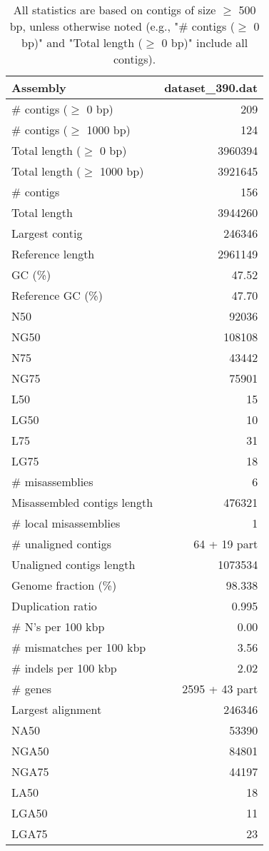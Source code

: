 \documentclass[12pt,a4paper]{article}
\begin{document}
\begin{table}[ht]
\begin{center}
\caption{All statistics are based on contigs of size $\geq$ 500 bp, unless otherwise noted (e.g., "\# contigs ($\geq$ 0 bp)" and "Total length ($\geq$ 0 bp)" include all contigs).}
\begin{tabular}{|l*{1}{|r}|}
\hline
Assembly & dataset\_390.dat \\ \hline
\# contigs ($\geq$ 0 bp) & 209 \\ \hline
\# contigs ($\geq$ 1000 bp) & 124 \\ \hline
Total length ($\geq$ 0 bp) & 3960394 \\ \hline
Total length ($\geq$ 1000 bp) & 3921645 \\ \hline
\# contigs & 156 \\ \hline
Total length & 3944260 \\ \hline
Largest contig & 246346 \\ \hline
Reference length & 2961149 \\ \hline
GC (\%) & 47.52 \\ \hline
Reference GC (\%) & 47.70 \\ \hline
N50 & 92036 \\ \hline
NG50 & 108108 \\ \hline
N75 & 43442 \\ \hline
NG75 & 75901 \\ \hline
L50 & 15 \\ \hline
LG50 & 10 \\ \hline
L75 & 31 \\ \hline
LG75 & 18 \\ \hline
\# misassemblies & 6 \\ \hline
Misassembled contigs length & 476321 \\ \hline
\# local misassemblies & 1 \\ \hline
\# unaligned contigs & 64 + 19 part \\ \hline
Unaligned contigs length & 1073534 \\ \hline
Genome fraction (\%) & 98.338 \\ \hline
Duplication ratio & 0.995 \\ \hline
\# N's per 100 kbp & 0.00 \\ \hline
\# mismatches per 100 kbp & 3.56 \\ \hline
\# indels per 100 kbp & 2.02 \\ \hline
\# genes & 2595 + 43 part \\ \hline
Largest alignment & 246346 \\ \hline
NA50 & 53390 \\ \hline
NGA50 & 84801 \\ \hline
NGA75 & 44197 \\ \hline
LA50 & 18 \\ \hline
LGA50 & 11 \\ \hline
LGA75 & 23 \\ \hline
\end{tabular}
\end{center}
\end{table}
\end{document}
